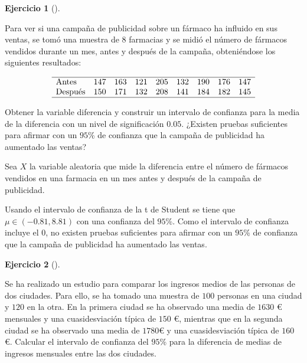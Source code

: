 \documentclass[
  spanish,
  a4paper,
]{scrreport}
\theoremstyle{definition}
\newtheorem{exercise}{Ejercicio}[chapter]
\theoremstyle{remark}
\begin{document}
\begin{exercise}[]\protect\hypertarget{exr-intervalo-confianza-ventas-fármaco}{}\label{exr-intervalo-confianza-ventas-fármaco}

Para ver si una campaña de publicidad sobre un fármaco ha influido en
sus ventas, se tomó una muestra de \(8\) farmacias y se midió el número
de fármacos vendidos durante un mes, antes y después de la campaña,
obteniéndose los siguientes resultados:

\[
\begin{array}{lcccccccc}
\hline
\mbox{Antes} & 147 & 163 & 121 & 205 & 132 & 190 & 176 & 147  \\
\mbox{Después} & 150 & 171 & 132 & 208 & 141 & 184 & 182 & 145  \\
\hline
\end{array}
\]

Obtener la variable diferencia y construir un intervalo de confianza
para la media de la diferencia con un nivel de significación \(0.05\).
¿Existen pruebas suficientes para afirmar con un \(95\)\% de confianza
que la campaña de publicidad ha aumentado las ventas?

\end{exercise}

\begin{tcolorbox}[enhanced jigsaw, arc=.35mm, bottomrule=.15mm, bottomtitle=1mm, breakable, colback=white, colbacktitle=quarto-callout-tip-color!10!white, colframe=quarto-callout-tip-color-frame, coltitle=black, left=2mm, leftrule=.75mm, opacityback=0, opacitybacktitle=0.6, rightrule=.15mm, title=\textcolor{quarto-callout-tip-color}{\faLightbulb}\hspace{0.5em}{Solución}, titlerule=0mm, toprule=.15mm, toptitle=1mm]

Sea \(X\) la variable aleatoria que mide la diferencia entre el número
de fármacos vendidos en una farmacia en un mes antes y después de la
campaña de publicidad.

Usando el intervalo de confianza de la t de Student se tiene que
\(\mu \in (-0.81, 8.81)\) con una confianza del \(95\)\%. Como el
intervalo de confianza incluye el \(0\), no existen pruebas suficientes
para afirmar con un \(95\)\% de confianza que la campaña de publicidad
ha aumentado las ventas.

\end{tcolorbox}

\begin{exercise}[]\protect\hypertarget{exr-intervalo-confianza-comparación-medias-ventas}{}\label{exr-intervalo-confianza-comparación-medias-ventas}

Se ha realizado un estudio para comparar los ingresos medios de las
personas de dos ciudades. Para ello, se ha tomado una muestra de \(100\)
personas en una ciudad y \(120\) en la otra. En la primera ciudad se ha
observado una media de \(1630\) € mensuales y una cuasidesviación típica
de \(150\) €, mientras que en la segunda ciudad se ha observado una
media de \(1780\)€ y una cuasidesviación típica de \(160\) €. Calcular
el intervalo de confianza del \(95\)\% para la diferencia de medias de
ingresos mensuales entre las dos ciudades.

\end{exercise}
\end{document}
